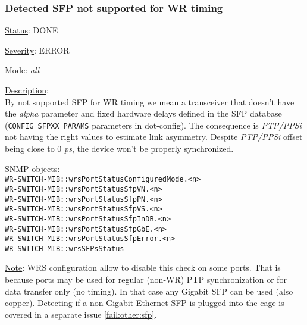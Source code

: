 \subsubsection{\bf Detected SFP not supported for WR timing}
		\label{fail:timing:wrong_sfp}
		\begin{packed_enum}
			\item [] \underline{Status}: DONE
			\item [] \underline{Severity}: ERROR
			\item [] \underline{Mode}: \emph{all}
			\item [] \underline{Description}:\\
				By not supported SFP for WR timing we mean a transceiver that doesn't
				have the \emph{alpha} parameter and fixed hardware delays defined in the
				SFP database (\texttt{CONFIG\_SFPXX\_PARAMS} parameters in dot-config). The consequence is
				\emph{PTP/PPSi} not having the right values to estimate link asymmetry.
				Despite \emph{PTP/PPSi} offset being close to 0 \emph{ps}, the device won't
				be properly synchronized.
			\item [] \underline{SNMP objects}:\\
				\texttt{WR-SWITCH-MIB::wrsPortStatusConfiguredMode.<n>}\\
				\texttt{WR-SWITCH-MIB::wrsPortStatusSfpVN.<n>}\\
				\texttt{WR-SWITCH-MIB::wrsPortStatusSfpPN.<n>}\\
				\texttt{WR-SWITCH-MIB::wrsPortStatusSfpVS.<n>}\\
				\texttt{WR-SWITCH-MIB::wrsPortStatusSfpInDB.<n>}\\
				\texttt{WR-SWITCH-MIB::wrsPortStatusSfpGbE.<n>}\\
				\texttt{WR-SWITCH-MIB::wrsPortStatusSfpError.<n>}\\
				\texttt{WR-SWITCH-MIB::wrsSFPsStatus}
			\item [] \underline{Note}: WRS configuration allow to disable this check on some ports.
				That is because ports may be used for regular (non-WR) PTP
				synchronization or for data transfer only (no timing). In that case any
				Gigabit SFP can be used (also copper). Detecting if a non-Gigabit
				Ethernet SFP is plugged into the cage is covered in a separate issue
				\ref{fail:other:sfp}.
		\end{packed_enum}


